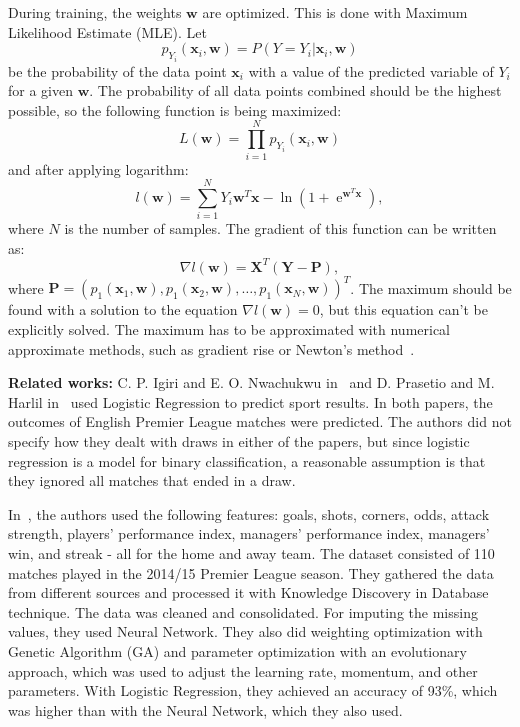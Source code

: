 \documentclass[thesis=M,english]{FITthesis}[2019/12/23]
\newcommand{\e}{\mathop{\mathrm{e}}}
\begin{document}
During training, the weights $\boldsymbol{w}$ are optimized. This is done with Maximum Likelihood Estimate (MLE). Let $$p_{Y_i}(\boldsymbol{x}_i, \boldsymbol{w}) = P(Y = Y_i|\boldsymbol{x}_i, \boldsymbol{w})$$ be the probability of the data point $\boldsymbol{x}_i$ with a value of the predicted variable of $Y_i$ for a given $\boldsymbol{w}$. The probability of all data points combined should be the highest possible, so the following function is being maximized: $$L(\boldsymbol{w}) = \prod_{i = 1}^N p_{Y_i}(\boldsymbol{x}_i, \boldsymbol{w})$$ and after applying logarithm: $$l(\boldsymbol{w}) = \sum_{i = 1}^N Y_i \boldsymbol{w}^T\boldsymbol{x} - \ln{(1 + {\e}^{\boldsymbol{w}^T\boldsymbol{x}})},$$ where $N$ is the number of samples. The gradient of this function can be written as: $$\nabla l(\boldsymbol{w}) = \boldsymbol{X}^T(\boldsymbol{Y} - \boldsymbol{P}),$$ where $\boldsymbol{P} = (p_1(\boldsymbol{x}_1, \boldsymbol{w}), p_1(\boldsymbol{x}_2, \boldsymbol{w}), \dots, p_1(\boldsymbol{x}_N, \boldsymbol{w}))^T$. The maximum should be found with a solution to the equation $\nabla l(\boldsymbol{w}) = 0$, but this equation can't be explicitly solved. The maximum has to be approximated with numerical approximate methods, such as gradient rise or Newton's method~\cite{lr}.

\noindent \textbf{Related works:} C. P. Igiri and E. O. Nwachukwu in~\cite{BPL_ANN_logistic_regression} and D. Prasetio and M. Harlil in~\cite{BPL_logistic_regression} used Logistic Regression to predict sport results. In both papers, the outcomes of English Premier League matches were predicted. The authors did not specify how they dealt with draws in either of the papers, but since logistic regression is a model for binary classification, a reasonable assumption is that they ignored all matches that ended in a draw.

In~\cite{BPL_ANN_logistic_regression}, the authors used the following features: goals, shots, corners, odds, attack strength, players’ performance index, managers’ performance index, managers’ win, and streak - all for the home and away team. The dataset consisted of 110 matches played in the 2014/15 Premier League season. They gathered the data from different sources and processed it with Knowledge Discovery in Database technique. The data was cleaned and consolidated. For imputing the missing values, they used Neural Network. They also did weighting optimization with Genetic Algorithm (GA) and parameter optimization with an evolutionary approach, which was used to adjust the learning rate, momentum, and other parameters. With Logistic Regression, they achieved an accuracy of 93\%, which was higher than with the Neural Network, which they also used.
\end{document}
